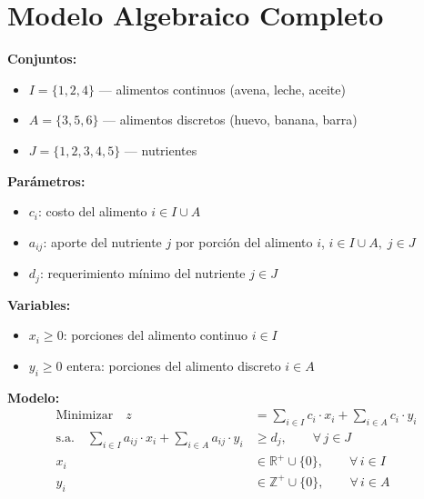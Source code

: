 \documentclass[12pt]{article}
\begin{document}
\section{Modelo Algebraico Completo}

\begin{mdframed}[backgroundcolor=gray!5, linewidth=1.5pt]
\textbf{Conjuntos:}
\begin{itemize}
    \item $I = \{1, 2, 4\}$ --- alimentos continuos (avena, leche, aceite)
    \item $A = \{3, 5, 6\}$ --- alimentos discretos (huevo, banana, barra)
    \item $J = \{1, 2, 3, 4, 5\}$ --- nutrientes
\end{itemize}

\medskip
\textbf{Par\'ametros:}
\begin{itemize}
    \item $c_i$: costo del alimento $i \in I \cup A$
    \item $a_{ij}$: aporte del nutriente $j$ por porci\'on del alimento $i$, \; $i \in I \cup A,\; j \in J$
    \item $d_j$: requerimiento m\'inimo del nutriente $j \in J$
\end{itemize}

\medskip
\textbf{Variables:}
\begin{itemize}
    \item $x_i \geq 0$: porciones del alimento continuo $i \in I$
    \item $y_i \geq 0$ entera: porciones del alimento discreto $i \in A$
\end{itemize}

\bigskip
\textbf{Modelo:}
\begin{align}
    \text{Minimizar}\quad z &= \sum_{i \in I} c_i \cdot x_i + \sum_{i \in A} c_i \cdot y_i \tag{F.O.} \\[10pt]
    \text{s.a.}\quad \sum_{i \in I} a_{ij} \cdot x_i + \sum_{i \in A} a_{ij} \cdot y_i &\geq d_j, \qquad \forall\, j \in J \tag{R1} \\[10pt]
    x_i &\in \mathbb{R}^+ \cup \{0\}, \qquad \forall\, i \in I \tag{R2} \\[10pt]
    y_i &\in \mathbb{Z}^+ \cup \{0\}, \qquad \forall\, i \in A \tag{R3}
\end{align}
\end{mdframed}
\end{document}
